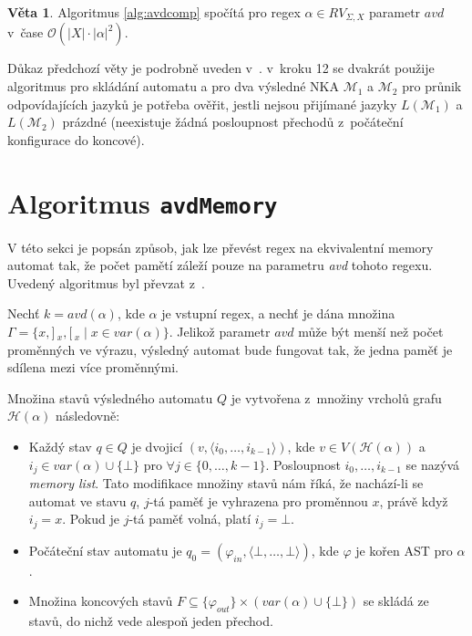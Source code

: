 \documentclass[thesis=B,czech]{FITthesis}[2019/12/23]
\theoremstyle{definition}
\newtheorem{theorem}{Věta}[chapter]
\begin{document}
\begin{theorem}\label{avdcomp}Algoritmus \ref{alg:avdcomp} spočítá pro regex $\alpha \in RV_{\Sigma, X}$ parametr $avd$ v~čase $\mathcal{O}(|X|\cdot|\alpha|^2)$. \cite{schmidref}
\end{theorem}
Důkaz předchozí věty je podrobně uveden v~\cite[s. 7]{schmidref}. v~kroku 12 se dvakrát použije algoritmus pro skládání automatu \cite[s. 54--56]{sestakova} a pro dva výsledné NKA $\mathcal{M}_1$ a $\mathcal{M}_2$ pro průnik odpovídajících jazyků je potřeba ověřit, jestli nejsou přijímané jazyky $L(\mathcal{M}_1)$ a $L(\mathcal{M}_2)$ prázdné (neexistuje žádná posloupnost přechodů z~počáteční konfigurace do koncové).

\section{Algoritmus \texttt{avdMemory}}

V této sekci je popsán způsob, jak lze převést regex na ekvivalentní memory automat tak, že počet pamětí záleží pouze na parametru \emph{avd} tohoto regexu. 
Uvedený algoritmus byl převzat z~\cite[kapitola 3]{schmidref}.

Nechť $k=avd(\alpha)$, kde $\alpha$ je vstupní regex, a nechť je dána množina $\Gamma = \{x, ]\,_x, [\,_x \mid x \in var(\alpha)\}$. Jelikož parametr $avd$ může být menší než počet proměnných ve výrazu, výsledný automat bude fungovat tak, že jedna paměť je sdílena mezi více proměnnými. 

Množina stavů výsledného automatu $Q$ je vytvořena z~množiny vrcholů grafu $\mathcal{H}(\alpha)$ následovně:
\begin{itemize}
	\item Každý stav $q \in Q$ je dvojicí $(v, \langle i_0, \dots, i_{k-1}  \rangle)$, kde $v \in V(\mathcal{H}(\alpha))$ a ${i_j \in var(\alpha) \cup \{\bot\}}$ pro $\forall j \in \{0, \dots, k-1\}$. Posloupnost $ i_0, \dots, i_{k-1}$ se nazývá \emph{memory list}. Tato modifikace množiny stavů nám říká, že nachází-li se automat ve stavu $q$, $j$-tá paměť je vyhrazena pro proměnnou $x$, právě když $i_j = x$. Pokud je $j$-tá paměť volná, platí $i_j = \bot$.
	\item Počáteční stav automatu je $q_0 = (\varphi_{in}, \langle \bot, \dots, \bot \rangle)$, kde $\varphi$ je kořen AST pro $\alpha$.
	\item Množina koncových stavů $F \subseteq \{\varphi_{out}\} \times (var(\alpha) \cup \{\bot\})$ se skládá ze stavů, do nichž vede alespoň jeden přechod. 
\end{itemize}
\end{document}
